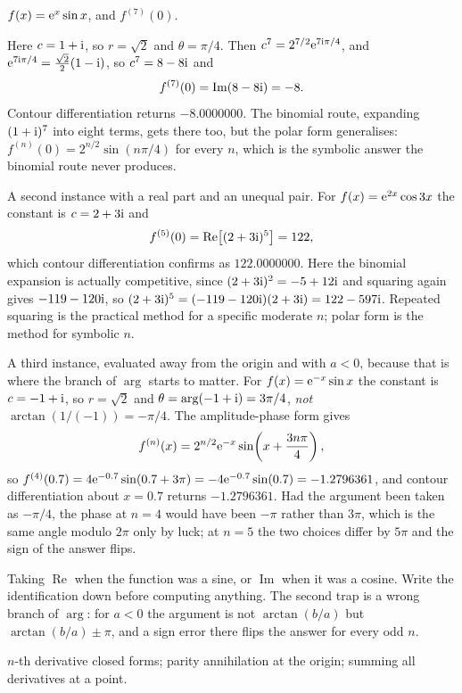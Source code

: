 \begin{worked}
$f(x)=\mathrm{e}^{x}\sin x$, and $f^{(7)}(0)$.

Here $c=1+\mathrm{i}$, so $r=\sqrt2$ and $\theta=\pi/4$. Then $c^{7}=2^{7/2}\mathrm{e}^{7\mathrm{i}\pi/4}$, and $\mathrm{e}^{7\mathrm{i}\pi/4}=\tfrac{\sqrt2}{2}(1-\mathrm{i})$, so $c^{7}=8-8\mathrm{i}$ and
\[
f^{(7)}(0)=\operatorname{Im}(8-8\mathrm{i})=-8 .
\]
Contour differentiation returns $-8.0000000$. The binomial route, expanding $(1+\mathrm{i})^{7}$ into eight terms, gets there too, but the polar form generalises: $f^{(n)}(0)=2^{n/2}\sin(n\pi/4)$ for every $n$, which is the symbolic answer the binomial route never produces.

A second instance with a real part and an unequal pair. For $f(x)=\mathrm{e}^{2x}\cos3x$ the constant is $c=2+3\mathrm{i}$ and
\[
f^{(5)}(0)=\operatorname{Re}\bigl[(2+3\mathrm{i})^{5}\bigr]=122 ,
\]
which contour differentiation confirms as $122.0000000$. Here the binomial expansion is actually competitive, since $(2+3\mathrm{i})^{2}=-5+12\mathrm{i}$ and squaring again gives $-119-120\mathrm{i}$, so $(2+3\mathrm{i})^{5}=(-119-120\mathrm{i})(2+3\mathrm{i})=122-597\mathrm{i}$. Repeated squaring is the practical method for a specific moderate $n$; polar form is the method for symbolic $n$.

A third instance, evaluated away from the origin and with $a<0$, because that is where the branch of $\arg$ starts to matter. For $f(x)=\mathrm{e}^{-x}\sin x$ the constant is $c=-1+\mathrm{i}$, so $r=\sqrt2$ and $\theta=\arg(-1+\mathrm{i})=3\pi/4$, \emph{not} $\arctan(1/(-1))=-\pi/4$. The amplitude-phase form gives
\[
f^{(n)}(x)=2^{n/2}\mathrm{e}^{-x}\sin\!\left(x+\frac{3n\pi}{4}\right),
\]
so $f^{(4)}(0.7)=4\mathrm{e}^{-0.7}\sin(0.7+3\pi)=-4\mathrm{e}^{-0.7}\sin(0.7)=-1.2796361$, and contour differentiation about $x=0.7$ returns $-1.2796361$. Had the argument been taken as $-\pi/4$, the phase at $n=4$ would have been $-\pi$ rather than $3\pi$, which is the same angle modulo $2\pi$ only by luck; at $n=5$ the two choices differ by $5\pi$ and the sign of the answer flips.
\end{worked}

\begin{trap}
Taking $\operatorname{Re}$ when the function was a sine, or $\operatorname{Im}$ when it was a cosine. Write the identification down before computing anything. The second trap is a wrong branch of $\arg$: for $a<0$ the argument is not $\arctan(b/a)$ but $\arctan(b/a)\pm\pi$, and a sign error there flips the answer for every odd $n$.
\end{trap}

\begin{seealsob}$n$-th derivative closed forms; parity annihilation at the origin; summing all derivatives at a point.\end{seealsob}

